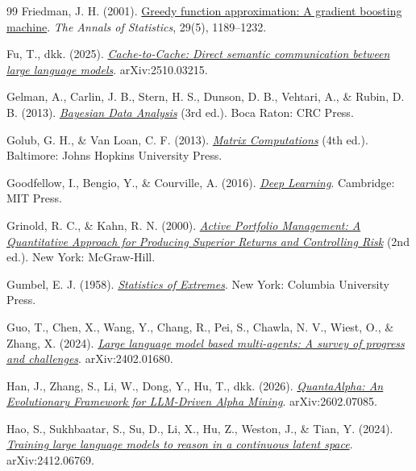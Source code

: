 \begin{thebibliography}{99}
Friedman, J. H. (2001).
\href{https://doi.org/10.1214/aos/1013203451}{Greedy function approximation:
A gradient boosting machine}. \emph{The Annals of Statistics}, 29(5),
1189--1232.

Fu, T., dkk. (2025).
\href{https://arxiv.org/abs/2510.03215}{\emph{Cache-to-Cache: Direct semantic
communication between large language models}}. arXiv:2510.03215.

Gelman, A., Carlin, J. B., Stern, H. S., Dunson, D. B., Vehtari, A., \&
Rubin, D. B. (2013).
\href{https://sites.stat.columbia.edu/gelman/book/BDA3.pdf}{\emph{Bayesian
Data Analysis}} (3rd ed.). Boca Raton: CRC Press.

Golub, G. H., \& Van Loan, C. F. (2013).
\href{https://archive.org/details/matrixcomputatio0004golu}{\emph{Matrix
Computations}} (4th ed.). Baltimore: Johns Hopkins University Press.

Goodfellow, I., Bengio, Y., \& Courville, A. (2016).
\href{https://www.deeplearningbook.org}{\emph{Deep Learning}}.
Cambridge: MIT Press.

Grinold, R. C., \& Kahn, R. N. (2000).
\href{https://archive.org/details/activeportfoliom0000grin}{\emph{Active
Portfolio Management: A Quantitative Approach for Producing Superior Returns
and Controlling Risk}} (2nd ed.). New York: McGraw-Hill.

Gumbel, E. J. (1958).
\href{https://archive.org/details/statisticsofextr0000gumb}{\emph{Statistics of
Extremes}}. New York: Columbia University Press.

Guo, T., Chen, X., Wang, Y., Chang, R., Pei, S., Chawla, N. V., Wiest, O., \&
Zhang, X. (2024).
\href{https://arxiv.org/abs/2402.01680}{\emph{Large language model based
multi-agents: A survey of progress and challenges}}. arXiv:2402.01680.

Han, J., Zhang, S., Li, W., Dong, Y., Hu, T., dkk. (2026).
\href{https://arxiv.org/abs/2602.07085}{\emph{QuantaAlpha: An Evolutionary
Framework for LLM-Driven Alpha Mining}}. arXiv:2602.07085.

Hao, S., Sukhbaatar, S., Su, D., Li, X., Hu, Z., Weston, J., \& Tian, Y. (2024).
\href{https://arxiv.org/abs/2412.06769}{\emph{Training large language models to
reason in a continuous latent space}}. arXiv:2412.06769.


\end{thebibliography}
